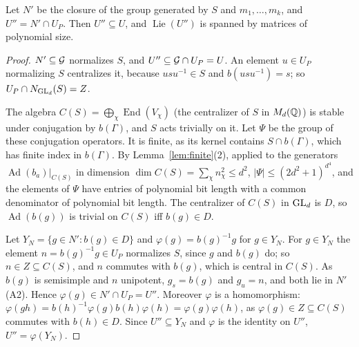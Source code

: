 \begin{lemma}\label{lem:Upp}
Let $N'$ be the closure of the group generated by $S$ and $m_1,\ldots,m_k$, and $U''=N'\cap U_P$.
Then $U''\subseteq U$, and $\operatorname{Lie}(U'')$ is spanned by matrices of polynomial size.
\end{lemma}
\begin{proof}
$N'\subseteq\mathcal{G}$ normalizes $S$, and $U''\subseteq\mathcal{G}\cap U_P=U$. An element $u\in U_P$ normalizing $S$
centralizes it, because $usu^{-1}\in S$ and $b(usu^{-1})=s$; so $U_P\cap N_{\mathrm{GL}_d}(S)=Z$.

The algebra $C(S)=\bigoplus_\chi\operatorname{End}(V_\chi)$ (the centralizer of $S$ in $M_d(\mathbb{Q})$) is stable under
conjugation by $b(\Gamma)$, and $S$ acts trivially on it. Let $\Psi$ be the group of these conjugation
operators. It is finite, as its kernel contains $S\cap b(\Gamma)$, which has finite index in $b(\Gamma)$.
By Lemma~\ref{lem:finite}(2), applied to the generators $\operatorname{Ad}(b_a)|_{C(S)}$ in dimension $\dim C(S)=\sum_\chi n_\chi^2\le d^2$,
$|\Psi|\le(2d^2+1)^{d^4}$, and the elements of $\Psi$ have entries of polynomial bit length with a common
denominator of polynomial bit length. The centralizer of $C(S)$ in $\mathrm{GL}_d$ is $D$, so $\operatorname{Ad}(b(g))$ is
trivial on $C(S)$ iff $b(g)\in D$.

Let $Y_N=\{g\in N':b(g)\in D\}$ and $\varphi(g)=b(g)^{-1}g$ for $g\in Y_N$. For $g\in Y_N$ the element
$n=b(g)^{-1}g\in U_P$ normalizes $S$, since $g$ and $b(g)$ do; so $n\in Z\subseteq C(S)$, and $n$ commutes
with $b(g)$, which is central in $C(S)$. As $b(g)$ is semisimple and $n$ unipotent, $g_s=b(g)$ and $g_u=n$,
and both lie in $N'$ (A2). Hence $\varphi(g)\in N'\cap U_P=U''$. Moreover $\varphi$ is a homomorphism:
$\varphi(gh)=b(h)^{-1}\varphi(g)b(h)\varphi(h)=\varphi(g)\varphi(h)$, as $\varphi(g)\in Z\subseteq C(S)$ commutes with
$b(h)\in D$. Since $U''\subseteq Y_N$ and $\varphi$ is the identity on $U''$, $U''=\varphi(Y_N)$.


\end{proof}
